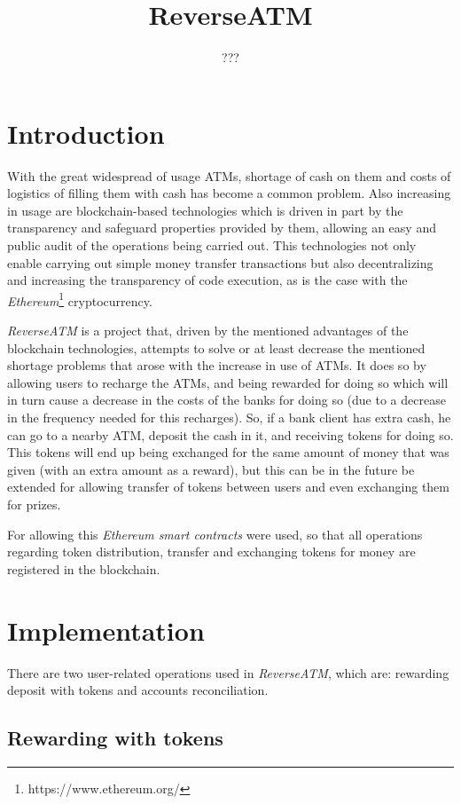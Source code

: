 \documentclass[a4paper]{article}
\title{ReverseATM}
\author{???}
\begin{document}
\maketitle

\section{Introduction}

With the great widespread of usage ATMs, shortage of cash on them and costs of logistics of filling them with cash has become a common problem. Also increasing in usage are blockchain-based technologies which is driven in part by the transparency and safeguard properties provided by them, allowing an easy and public audit of the operations being carried out. This technologies not only enable carrying out simple money transfer transactions but also decentralizing and increasing the transparency of code execution, as is the case with the \textit{Ethereum}\footnote{https://www.ethereum.org/} cryptocurrency.

\textit{ReverseATM} is a project that, driven by the mentioned advantages of the blockchain technologies, attempts to solve or at least decrease the mentioned shortage problems that arose with the increase in use of ATMs. It does so by allowing users to recharge the ATMs, and being rewarded for doing so which will in turn cause a decrease in the costs of the banks for doing so (due to a decrease in the frequency needed for this recharges). So, if a bank client has extra cash, he can go to a nearby ATM, deposit the cash in it, and receiving tokens for doing so. This tokens will end up being exchanged for the same amount of money that was given (with an extra amount as a reward), but this can be in the future be extended for allowing transfer of tokens between users and even exchanging them for prizes.

For allowing this \textit{Ethereum smart contracts} were used, so that all operations regarding token distribution, transfer and exchanging tokens for money are registered in the blockchain.

\section{Implementation}

There are two user-related operations used in \textit{ReverseATM}, which are: rewarding deposit with tokens and accounts reconciliation.

\subsection{Rewarding with tokens}
\end{document}
